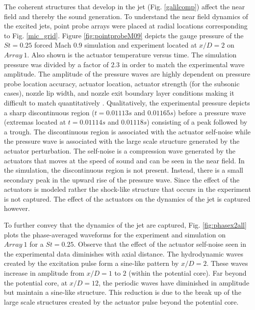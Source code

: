 \documentclass[english]{aiaa-tc}
\begin{document}
The coherent structures that develop in the jet (Fig. \ref{galilcomp}) affect the near field and thereby the sound generation. 
To understand the near field dynamics of the excited jets, point probe arrays were placed at radial locations corresponding to Fig. \ref{mic_grid}. 
Figure \ref{fig:pointprobeM09} depicts the gauge pressure of the $St=0.25$ forced Mach 0.9 simulation and experiment located at $x/D=2$ on $Array~1$. Also shown is the actuator temperature versus time. The simulation pressure was divided by a factor of $2.3$ in order to match the experimental wave amplitude. The amplitude of the pressure waves are highly dependent on pressure probe location accuracy, actuator location, actuator strength (for the subsonic cases), nozzle lip width, and nozzle exit boundary layer conditions making it difficult to match quantitatively \cite{sinha2013}. Qualitatively, the experimental pressure depicts a sharp discontinuous region ($t=0.01113s$ and $0.01165s$)  before a pressure wave (extremas located at $t=0.01114s$ and $0.01118s$) consisting of a peak followed by a trough. The discontinuous region is associated with the actuator self-noise while the pressure wave is associated with the large scale structure generated by the actuator perturbation. The self-noise is a compression wave generated by the actuators that moves at the speed of sound and can be seen in the near field. In the simulation, the discontinuous region is not present. Instead, there is a small secondary peak in the upward rise of the pressure wave. Since the effect of the actuators is modeled rather the shock-like structure that occurs in the experiment is not captured. The effect of the actuators on the dynamics of the jet is captured however. 

To further convey that the dynamics of the jet are captured, Fig. \ref{fig:phasex2all} plots the phase-averaged waveforms for the experiment and simulation on $Array~1$ for a $St=0.25$. Observe that the effect of the actuator self-noise seen in the experimental data diminishes with axial distance. The hydrodynamic waves created by the excitation pulse form a sine-like pattern by $x/D=2$. These waves increase in amplitude from $x/D=1$ to $2$ (within the potential core). Far beyond the potential core, at $x/D=12$, the periodic waves have diminished in amplitude but maintain a sine-like structure. This reduction is due to the break up of the large scale structures created by the actuator pulse beyond the potential core. 
\end{document}
